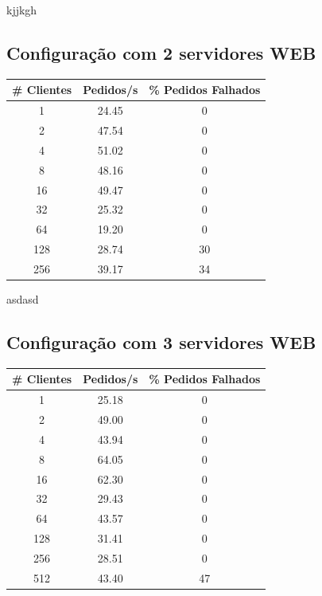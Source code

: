kjjkgh

\subsection{Configuração com 2 servidores WEB}


\begin{tabular}{|c|c|c|}
\hline
\textbf{\# Clientes} & \textbf{Pedidos/s} & \textbf{\% Pedidos Falhados} \\ \hline
1 & 24.45 & 0 \\ \hline
2 & 47.54 & 0 \\ \hline
4 & 51.02 & 0 \\ \hline
8 & 48.16 & 0 \\ \hline
16 & 49.47 & 0 \\ \hline
32 & 25.32 & 0 \\ \hline
64 & 19.20 & 0 \\ \hline
128 & 28.74 & 30 \\ \hline
256 & 39.17 & 34 \\ \hline
\end{tabular}

asdasd

\subsection{Configuração com 3 servidores WEB}


\begin{tabular}{|c|c|c|}
\hline
\textbf{\# Clientes} & \textbf{Pedidos/s} & \textbf{\% Pedidos Falhados} \\ \hline
1 & 25.18 & 0 \\ \hline
2 & 49.00 & 0 \\ \hline
4 & 43.94 & 0 \\ \hline
8 & 64.05 & 0 \\ \hline
16 & 62.30 & 0 \\ \hline
32 & 29.43 & 0 \\ \hline
64 & 43.57 & 0 \\ \hline
128 & 31.41 & 0 \\ \hline
256 & 28.51 & 0 \\ \hline
512 & 43.40 & 47 \\ \hline
\end{tabular}

